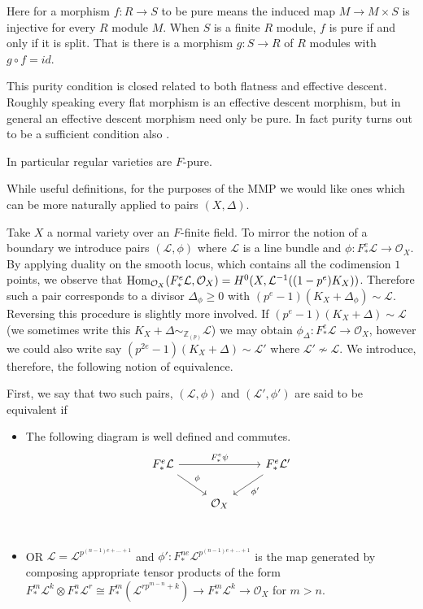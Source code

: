 \documentclass[a4paper,12pt]{book}
\newcommand{\Hom}{\textup{Hom}}
\newcommand{\Fe}{F^{e}_{*}}
\newcommand{\ox}[1][X]{\mathcal{O}_{#1}}
\newcommand{\zp}{\mathbb{Z}_{(p)}}
\begin{document}
Here for a morphism $f:R \to S$ to be pure means the induced map $M \to M \times S$ is injective for every $R$ module $M$. When $S$ is a finite $R$ module, $f$ is pure if and only if it is split. That is there is a morphism $g:S \to R$ of $R$ modules with $g \circ f =id$.

\begin{remark}

	This purity condition is closed related to both flatness and effective descent. Roughly speaking every flat morphism is an effective descent morphism, but in general an effective descent morphism need only be pure. In fact purity turns out to be a sufficient condition also \cite[Tag 08WE]{stacks-project}.
	
	In particular regular varieties are $F$-pure.
	
	\end{remark}

While useful definitions, for the purposes of the MMP we would like ones which can be more naturally applied to pairs $(X,\Delta)$.

Take $X$ a normal variety over an $F$-finite field. To mirror the notion of a boundary we introduce pairs $(\mathcal{L}, \phi)$ where $\mathcal{L}$ is a line bundle and $\phi: \Fe \mathcal{L} \to \ox$. By applying duality on the smooth locus, which contains all the codimension $1$ points, we observe that $\Hom_{\ox}(\Fe \mathcal{L},\ox)=H^{0}(X,\mathcal{L}^{-1}((1-p^{e})K_{X}))$. Therefore such a pair corresponds to a divisor $\Delta_{\phi} \geq 0$ with $(p^{e}-1)(K_{X}+\Delta_{\phi}) \sim \mathcal{L}$. Reversing this procedure is slightly more involved. If ${(p^{e}-1)(K_{X}+\Delta) \sim \mathcal{L}}$ (we sometimes write this $K_{X}+\Delta \sim_{\zp} \mathcal{L}$) we may obtain $\phi_{\Delta}:\Fe \mathcal{L} \to \ox$, however we could also write say $(p^{2e}-1)(K_{X}+\Delta) \sim \mathcal{L'}$ where $\mathcal{L'} \not\sim \mathcal{L}$. We introduce, therefore, the following notion of equivalence.

First, we say that two such pairs, $(\mathcal{L}, \phi)$ and $(\mathcal{L}', \phi')$ are said to be equivalent if

\begin{itemize}
	\item The following diagram is well defined and commutes.
	\[\begin{tikzcd}
	\Fe \mathcal{L} \arrow[rd, "\phi"] \arrow[rr, "\Fe \psi"] &     & \Fe \mathcal{L}' \arrow[ld, "\phi'"] \\
	& \ox &                                     
	\end{tikzcd}\]
	\\
	\item OR $\mathcal{L}=\mathcal{L}^{p^{(n-1)e+...+1}}$ and $\phi':F_{*}^{ne}\mathcal{L}^{p^{(n-1)e+...+1}}$ is the map generated by composing appropriate tensor products of the form $F_{*}^{m}\mathcal{L}^{k} \otimes F_{*}^{n} \mathcal{L}^{r}\cong F_{*}^{m}(\mathcal{L}^{rp^{m-n}+k}) \to F^{m}_{*}\mathcal{L}^{k}\to \ox$ for $m>n$.
\end{itemize}
\end{document}
